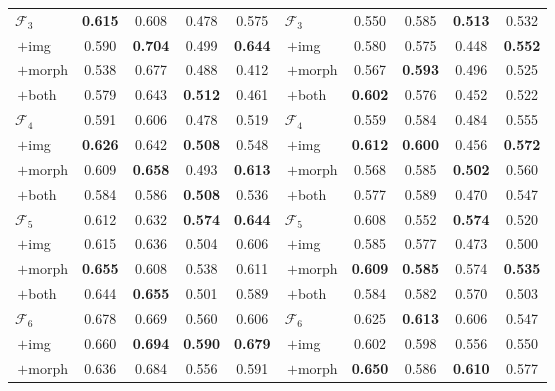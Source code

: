 \documentclass[pdflatex,sn-nature]{sn-jnl}
\begin{document}
\begin{table}[p]
\begin{tabular}{@{}l cccc @{\hskip 1.2em} l cccc@{}}
$\mathcal{F}_3$      & \textbf{0.615} & 0.608 & 0.478 & 0.575 & $\mathcal{F}_3$      & 0.550 & 0.585 & \textbf{0.513} & 0.532 \\
\;\,$+$img           & 0.590 & \textbf{0.704} & 0.499 & \textbf{0.644} & \;\,$+$img           & 0.580 & 0.575 & 0.448 & \textbf{0.552} \\
\;\,$+$morph         & 0.538 & 0.677 & 0.488 & 0.412 & \;\,$+$morph         & 0.567 & \textbf{0.593} & 0.496 & 0.525 \\
\;\,$+$both          & 0.579 & 0.643 & \textbf{0.512} & 0.461 & \;\,$+$both          & \textbf{0.602} & 0.576 & 0.452 & 0.522 \\
\addlinespace[2pt]
$\mathcal{F}_4$      & 0.591 & 0.606 & 0.478 & 0.519 & $\mathcal{F}_4$      & 0.559 & 0.584 & 0.484 & 0.555 \\
\;\,$+$img           & \textbf{0.626} & 0.642 & \textbf{0.508} & 0.548 & \;\,$+$img           & \textbf{0.612} & \textbf{0.600} & 0.456 & \textbf{0.572} \\
\;\,$+$morph         & 0.609 & \textbf{0.658} & 0.493 & \textbf{0.613} & \;\,$+$morph         & 0.568 & 0.585 & \textbf{0.502} & 0.560 \\
\;\,$+$both          & 0.584 & 0.586 & \textbf{0.508} & 0.536 & \;\,$+$both          & 0.577 & 0.589 & 0.470 & 0.547 \\
\addlinespace[2pt]
$\mathcal{F}_5$      & 0.612 & 0.632 & \textbf{0.574} & \textbf{0.644} & $\mathcal{F}_5$      & 0.608 & 0.552 & \textbf{0.574} & 0.520 \\
\;\,$+$img           & 0.615 & 0.636 & 0.504 & 0.606 & \;\,$+$img           & 0.585 & 0.577 & 0.473 & 0.500 \\
\;\,$+$morph         & \textbf{0.655} & 0.608 & 0.538 & 0.611 & \;\,$+$morph         & \textbf{0.609} & \textbf{0.585} & 0.574 & \textbf{0.535} \\
\;\,$+$both          & 0.644 & \textbf{0.655} & 0.501 & 0.589 & \;\,$+$both          & 0.584 & 0.582 & 0.570 & 0.503 \\
\addlinespace[2pt]
$\mathcal{F}_6$      & 0.678 & 0.669 & 0.560 & 0.606 & $\mathcal{F}_6$      & 0.625 & \textbf{0.613} & 0.606 & 0.547 \\
\;\,$+$img           & 0.660 & \textbf{0.694} & \textbf{0.590} & \textbf{0.679} & \;\,$+$img           & 0.602 & 0.598 & 0.556 & 0.550 \\
\;\,$+$morph         & 0.636 & 0.684 & 0.556 & 0.591 & \;\,$+$morph         & \textbf{0.650} & 0.586 & \textbf{0.610} & 0.577 \\

\end{tabular}
\end{table}
\end{document}

